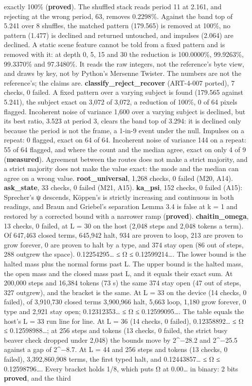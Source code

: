 \begin{description}
exactly 100\% (\textbf{proved}). The shuffled stack reads period 11 at 2.161, and rejecting at the wrong period, 63, removes 0.2298\%. Against the band top of 5.241 over 8 shuffles, the matched pattern (179.565) is removed at 100\%, no pattern (1.477) is declined and returned untouched, and impulses (2.064) are declined. A static scene feature cannot be told from a fixed pattern and is removed with it: at depth 0, 5, 15 and 30 the reduction is 100.0000\%, 99.9263\%, 99.3370\% and 97.3480\%. It reads the raw integers, not the reference's byte view, and draws by key, not by Python's Mersenne Twister. The numbers are not the reference's; the claims are. \textbf{classify\_\allowbreak{}reject\_\allowbreak{}recover} (ART-4-007 ported), 7 checks, 0 failed. A fixed pattern over a varying subject is found (179.565 against 5.241), the subject exact on 3,072 of 3,072, a reduction of 100\%, 0 of 64 pixels flagged. Incoherent noise of variance 1,600 over a varying subject is declined, but its best ratio, 3.523 at period 3, clears the band top of 3.294: it is declined only because the period is not the frame, a 1-in-9 event under the null. Impulses on a repeat: 0 flagged, exact on 64 of 64. Incoherent noise of variance 144 on a repeat: 55 of 64 flagged, and where the count and the median agree, exact on only 4 of 9 (\textbf{measured}). Agreement between the routes does not make a strict majority, and a strict majority does not make the value exact: the mode and the median can agree on a wrong value. \textbf{root\_\allowbreak{}universal}, 1,268 checks, 0 failed (M20, A14). \textbf{ask\_\allowbreak{}state}, 33 checks, 0 failed (M21, A15). \textbf{ka\_\allowbreak{}psi}, 152 checks, 0 failed (A15): Sprecher's ψ descends, Köppen's is strictly increasing and continuous in both readings, and Braun and Griebel's separation Lemma 3.4 is false at k = 1 and restored by a corrected bound with a narrower ramp (\textbf{proved}). \textbf{chaitin\_\allowbreak{}omega}, 13 checks, 0 failed, at L = 30 on the host (2,048 steps and 2,048 tokens a term). Of 647,463 closed terms, 645,942 halt, 934 are proven to loop, 213 are proven to grow forever, 0 are proven to halt by a type, and 374 stay open (86 out of steps, 288 outgrew the space). 0.12254295… ≤ Ω ≤ 0.12599214…. The lower bound is the halted mass plus the normal forms past L. The upper bound is the halted mass, the open mass and the closed mass past L, and it equals their exact sum. At 200,000 steps and 16,384 tokens (73 s) the same 374 stay open (47 out of steps, 327 outgrew), and the bracket is the same. At L = 33 on the device (14 checks, 0 failed), of 3,910,730 closed terms 3,900,966 halt, 5,663 loop, 1,180 grow forever, 0 type and 2,921 stay open; 0.12312353… ≤ Ω ≤ 0.12599095…. The table equals the host's L = 33 run line for line. At L = 36 (14 checks, 0 failed), 0.12358892… ≤ Ω ≤ 0.12598988…; at 256 steps and tokens (13 checks, 0 failed, the strict busy beaver check dropped under 2,048) the bounds move by 2\textasciicircum{}−28.2 and 2\textasciicircum{}−25.5 against a gap of 2\textasciicircum{}−8.7. At L = 44 and 256 steps and tokens (13 checks, 0 failed), 3,392,860,908 terms, the first typed halt, and 0.12443857… ≤ Ω ≤ 0.12598796…. Every bracket holds 1/8, which puts Ω at 0.00… in binary: 2 bits \textbf{proved}, and the third 
\end{description}
